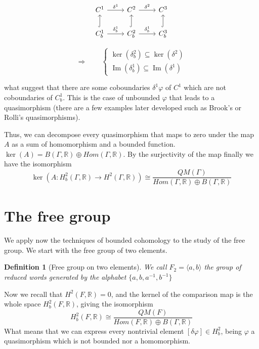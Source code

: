 \documentclass[leqno]{article}
\DeclareMathOperator{\im}{Im}
\newtheorem*{definition}{Definition}
\begin{document}
\begin{minipage}{0.5\textwidth}
\[\begin{tikzcd}
	{C^1} & {C^2} & {C^3} \\
	{C^1_b} & {C^2_b} & {C^3_b}
	\arrow["{\delta^1}", from=1-1, to=1-2]
	\arrow["{\delta^2}", from=1-2, to=1-3]
	\arrow["{\delta^1_b}", from=2-1, to=2-2]
	\arrow["{\delta^1_b}", from=2-2, to=2-3]
	\arrow[hook, from=2-2, to=1-2]
	\arrow[hook, from=2-1, to=1-1]
	\arrow[hook, from=2-3, to=1-3]
\end{tikzcd}\]
\end{minipage}
\begin{minipage}{0.5\textwidth}
\[
  \Rightarrow \qquad
\begin{cases}
  \ker(\delta^2_b) \subseteq  \ker(\delta^2) \\
  \im(\delta^1_b) \subseteq \im(\delta^1)
\end{cases}
\] 
\end{minipage}

what suggest that there are some coboundaries $\delta^1 \varphi $ of $C^1$ which are not coboundaries of $C^1_b$. This is the case of unbounded $\varphi$ that leads to a quasimorphism (there are a few examples later developed such as Brook's or Rolli's quasimorphisms).

Thus, we can decompose every quasimorphism that maps to zero under the map $A$ as a sum of homomorphism and a bounded function.  $\ker(A) = B(\Gamma, \mathbb{R})\oplus Hom(\Gamma , \mathbb{R})$. By the surjectivity of the map finally we have the isomorphism
\[
\ker(A: H_b^2(\Gamma , \mathbb{R})\to H^2(\Gamma, \mathbb{R})) \cong \frac{QM(\Gamma )}{Hom(\Gamma , \mathbb{R})\oplus B(\Gamma , \mathbb{R})}
\] 

\section{The free group}
We apply now the techniques of bounded cohomology to the study of the free group. We start with the free group of two elements.

\begin{definition}[Free group on two elements] We call $F_2 = \langle a, b \rangle  $ the group of reduced words generated by the alphabet $\{a, b, a^{-1}, b^{-1}\}$
\end{definition}

Now we recall that $H^2(F, \mathbb{R}) = 0$, and the kernel of the comparison map is the whole space $H^2_b(F, \mathbb{R})$, giving the isomorphism
\[
H^2_b(F, \mathbb{R}) \cong \frac{QM(F)}{Hom(F, \mathbb{R})\oplus B(\Gamma , \mathbb{R})}
\] 
What means that we can express every nontrivial element $[\delta \varphi ]\in H^2_b$, being $\varphi $ a quasimorphism which is not bounded nor a homomorphism.
\end{document}

